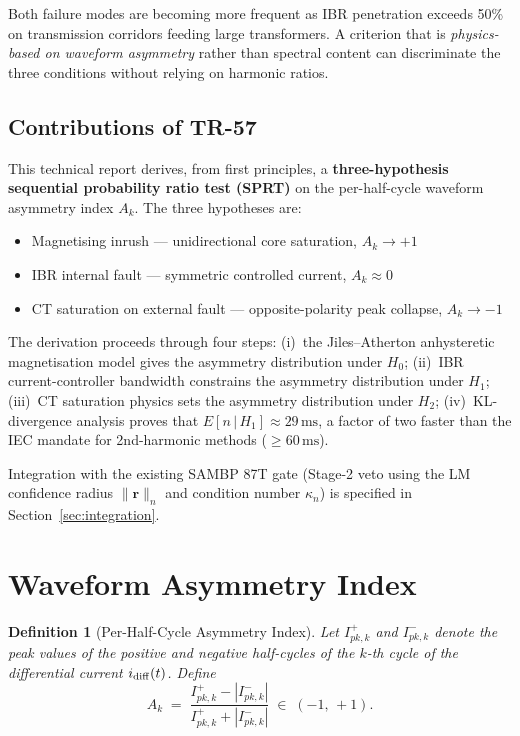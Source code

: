 \documentclass[11pt, a4paper]{article}
\newtheorem{definition}{Definition}
\newcommand{\Ak}{A_k}
\newcommand{\ms}{\,\text{ms}}
\begin{document}
Both failure modes are becoming more frequent as IBR penetration exceeds 50\%
on transmission corridors feeding large transformers.  A criterion that is
\emph{physics-based on waveform asymmetry} rather than spectral content can
discriminate the three conditions without relying on harmonic ratios.

\subsection{Contributions of TR-57}

This technical report derives, from first principles, a \textbf{three-hypothesis
sequential probability ratio test (SPRT)} on the per-half-cycle waveform
asymmetry index $\Ak$.  The three hypotheses are:

\begin{itemize}
  \item[$H_0$:] Magnetising inrush — unidirectional core saturation, $\Ak \to +1$
  \item[$H_1$:] IBR internal fault — symmetric controlled current, $\Ak \approx 0$
  \item[$H_2$:] CT saturation on external fault — opposite-polarity peak collapse,
    $\Ak \to -1$
\end{itemize}

The derivation proceeds through four steps:
(i)~the Jiles–Atherton anhysteretic magnetisation model gives the asymmetry
distribution under $H_0$;
(ii)~IBR current-controller bandwidth constrains the asymmetry distribution
under $H_1$;
(iii)~CT saturation physics sets the asymmetry distribution under $H_2$;
(iv)~KL-divergence analysis proves that $E[n\,|\,H_1] \approx 29\ms$, a factor
of two faster than the IEC mandate for 2nd-harmonic methods ($\geq 60\ms$).

Integration with the existing SAMBP 87T gate (Stage-2 veto using the
LM confidence radius $\|\mathbf{r}\|_n$ and condition number $\kappa_n$) is
specified in Section~\ref{sec:integration}.

\section{Waveform Asymmetry Index}
\label{sec:asymmetry_index}

\begin{definition}[Per-Half-Cycle Asymmetry Index]
Let $I^+_{pk,k}$ and $I^-_{pk,k}$ denote the peak values of the positive and
negative half-cycles of the $k$-th cycle of the differential current
$i_{\rm diff}(t)$.  Define
\begin{equation}
  \Ak \;=\; \frac{I^+_{pk,k} - |I^-_{pk,k}|}{I^+_{pk,k} + |I^-_{pk,k}|}
  \;\in\;(-1,\,+1).
  \label{eq:Ak_def}
\end{equation}
\end{definition}
\end{document}
